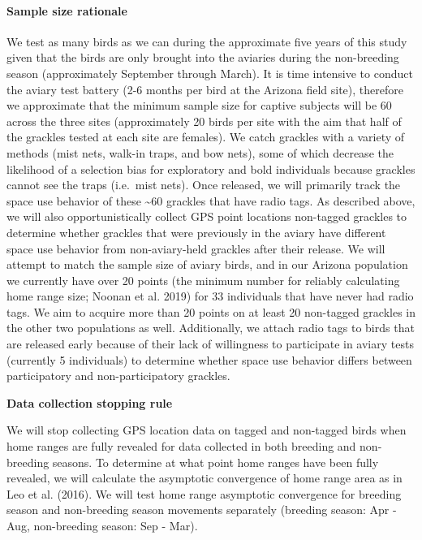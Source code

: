 \documentclass[
]{article}
\begin{document}
\hypertarget{sample-size-rationale}{%
\paragraph{Sample size rationale}\label{sample-size-rationale}}

We test as many birds as we can during the approximate five years of
this study given that the birds are only brought into the aviaries
during the non-breeding season (approximately September through March).
It is time intensive to conduct the aviary test battery (2-6 months per
bird at the Arizona field site), therefore we approximate that the
minimum sample size for captive subjects will be 60 across the three
sites (approximately 20 birds per site with the aim that half of the
grackles tested at each site are females). We catch grackles with a
variety of methods (mist nets, walk-in traps, and bow nets), some of
which decrease the likelihood of a selection bias for exploratory and
bold individuals because grackles cannot see the traps (i.e.~mist nets).
Once released, we will primarily track the space use behavior of these
\textasciitilde60 grackles that have radio tags. As described above, we
will also opportunistically collect GPS point locations non-tagged
grackles to determine whether grackles that were previously in the
aviary have different space use behavior from non-aviary-held grackles
after their release. We will attempt to match the sample size of aviary
birds, and in our Arizona population we currently have over 20 points
(the minimum number for reliably calculating home range size; Noonan et
al. 2019) for 33 individuals that have never had radio tags. We aim to
acquire more than 20 points on at least 20 non-tagged grackles in the
other two populations as well. Additionally, we attach radio tags to
birds that are released early because of their lack of willingness to
participate in aviary tests (currently 5 individuals) to determine
whether space use behavior differs between participatory and
non-participatory grackles.

\textbf{Data collection stopping rule}

We will stop collecting GPS location data on tagged and non-tagged birds
when home ranges are fully revealed for data collected in both breeding
and non-breeding seasons. To determine at what point home ranges have
been fully revealed, we will calculate the asymptotic convergence of
home range area as in Leo et al. (2016). We will test home range
asymptotic convergence for breeding season and non-breeding season
movements separately (breeding season: Apr - Aug, non-breeding season:
Sep - Mar).
\end{document}
